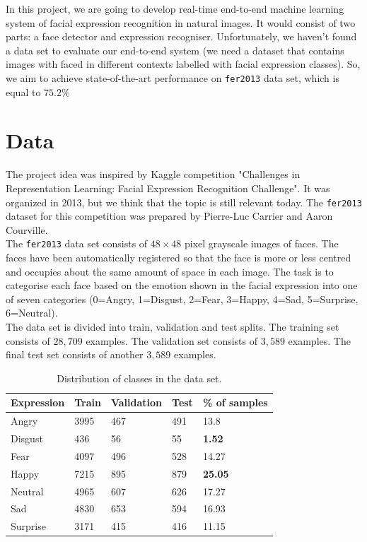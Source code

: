 In this project, we are going to develop real-time end-to-end machine learning system of facial expression recognition in natural images. It would consist of two parts: a face detector and expression recogniser. Unfortunately, we haven't found a data set to evaluate our end-to-end system (we need a dataset that contains images with faced in different contexts labelled with facial expression classes). So, we aim to achieve state-of-the-art performance on \texttt{fer2013} data set, which is equal to $75.2\%$

\section{Data}

The project idea was inspired by Kaggle competition "Challenges in Representation Learning: Facial Expression Recognition Challenge". It was organized in 2013, but we think that the topic is still relevant today. The \texttt{fer2013} dataset \cite{dataset} for this competition was prepared by Pierre-Luc Carrier and Aaron Courville.\\

The \texttt{fer2013} data set consists of $48\times48$ pixel grayscale images of faces. The faces have been automatically registered so that the face is more or less centred and occupies about the same amount of space in each image. The task is to categorise each face based on the emotion shown in the facial expression into one of seven categories (0=Angry, 1=Disgust, 2=Fear, 3=Happy, 4=Sad, 5=Surprise, 6=Neutral).\\

The data set is divided into train, validation and test splits. The training set consists of $28,709$ examples. The validation set consists of $3,589$ examples. The final test set consists of another $3,589$ examples.\\

\begin{table}[H]
	\centering
	\begin{tabular}{ | l | l | l | l | l | }
		\hline
		Expression & Train & Validation & Test & \% of samples \\ \hline
		Angry & 3995 & 467 & 491 & 13.8 \\ %
		Disgust & 436 & 56 & 55 & \textbf{1.52} \\ %
		Fear & 4097 & 496 & 528 & 14.27 \\ %
		Happy & 7215 & 895 & 879 & \textbf{25.05} \\ %
		Neutral & 4965 & 607 & 626 & 17.27 \\ %
		Sad & 4830 & 653 & 594 & 16.93 \\ %
		Surprise & 3171 & 415 & 416 & 11.15 \\ 
		\hline
	\end{tabular}
	\caption{Distribution of classes in the data set.}
\end{table}

